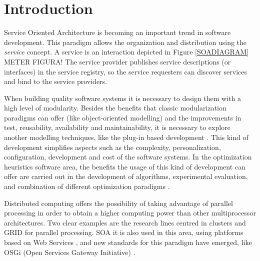 \documentclass{sig-alternate}
\begin{document}




%
%
\section{Introduction}
\label{sec:intro}
%

Service Oriented Architecture \cite{PAPAZOGLOU} is becoming an important trend in software development. This paradigm allows the organization and distribution using the {\em service} concept. A service is an interaction depicted in Figure \ref{SOADIAGRAM} METER FIGURA! The service provider publishes service descriptions (or interfaces) in the service registry, so the service requesters can discover services and bind to the service providers.


When building quality software systems it is necessary to design them
with a high level of modularity. Besides the benefits that classic
modularization paradigms can offer (like object-oriented modelling)
and the improvements in test, reusability, availability and
maintainability, it is necessary to explore another modelling techniques, like the
plug-in based development \cite{PLUGINS}. This kind of development
simplifies aspects such as the complexity, personalization, configuration,
development and cost of the software systems. In the optimization
heuristics software area, the benefits the usage of this kind of
development can offer are carried out in the development of algorithms,
experimental evaluation, and combination of different optimization
paradigms \cite{PLUGINS}.  










Distributed computing offers the possibility of taking advantage of parallel processing
 in order to obtain a higher 
computing power than other multiprocessor architectures. Two clear examples are the
research lines centred in clusters \cite{Buyya} and GRID \cite{OPENSCIENCEGRID}
for parallel processing. SOA it is also used in this area, using platforms based on Web Services \cite{PAPAZOGLOU}, and new standards for this paradigm have emerged, like OSGi (Open Services Gateway Initiative) \cite{OSGI}.
\end{document}
